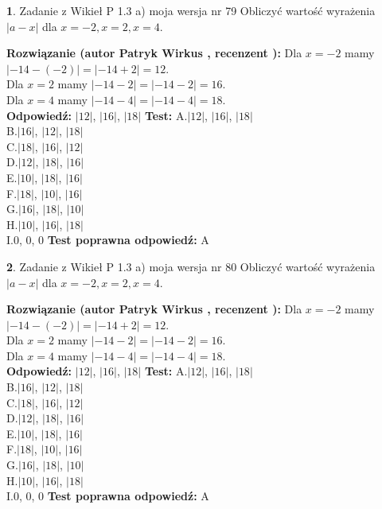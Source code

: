 \documentclass[12pt, a4paper]{article}
\theoremstyle{definition} %
\newtheorem{zad}{}
\newcommand{\zadStart}[1]{\begin{zad}#1\newline}
\newcommand{\zadStop}{\end{zad}}
\newcommand{\rozwStart}[2]{\noindent \textbf{Rozwiązanie (autor #1 , recenzent #2): }\newline}
\newcommand{\rozwStop}{\newline}
\newcommand{\odpStart}{\noindent \textbf{Odpowiedź:}\newline}
\newcommand{\odpStop}{\newline}
\newcommand{\testStart}{\noindent \textbf{Test:}\newline}
\newcommand{\testStop}{\newline}
\newcommand{\kluczStart}{\noindent \textbf{Test poprawna odpowiedź:}\newline}
\newcommand{\kluczStop}{\newline}
\begin{document}
\zadStart{Zadanie z Wikieł P 1.3 a) moja wersja nr 79}
Obliczyć wartość wyrażenia $|a - x|$ dla $x=-2,x=2,x=4$.
\zadStop
\rozwStart{Patryk Wirkus}{}
Dla $x = -2$ mamy $|-14 - (-2)| = |-14 + 2| = 12$.\\
Dla $x = 2$ mamy $|-14 - 2| = |-14 - 2| = 16$.\\
Dla $x = 4$ mamy $|-14 - 4| = |-14 - 4| = 18$.\\
\rozwStop
\odpStart
$|12|$, $|16|$, $|18|$
\odpStop
\testStart
A.$|12|$, $|16|$, $|18|$\\
B.$|16|$, $|12|$, $|18|$\\
C.$|18|$, $|16|$, $|12|$\\
D.$|12|$, $|18|$, $|16|$\\
E.$|10|$, $|18|$, $|16|$\\
F.$|18|$, $|10|$, $|16|$\\
G.$|16|$, $|18|$, $|10|$\\
H.$|10|$, $|16|$, $|18|$\\
I.$0$, $0$, $0$
\testStop
\kluczStart
A
\kluczStop



\zadStart{Zadanie z Wikieł P 1.3 a) moja wersja nr 80}
Obliczyć wartość wyrażenia $|a - x|$ dla $x=-2,x=2,x=4$.
\zadStop
\rozwStart{Patryk Wirkus}{}
Dla $x = -2$ mamy $|-14 - (-2)| = |-14 + 2| = 12$.\\
Dla $x = 2$ mamy $|-14 - 2| = |-14 - 2| = 16$.\\
Dla $x = 4$ mamy $|-14 - 4| = |-14 - 4| = 18$.\\
\rozwStop
\odpStart
$|12|$, $|16|$, $|18|$
\odpStop
\testStart
A.$|12|$, $|16|$, $|18|$\\
B.$|16|$, $|12|$, $|18|$\\
C.$|18|$, $|16|$, $|12|$\\
D.$|12|$, $|18|$, $|16|$\\
E.$|10|$, $|18|$, $|16|$\\
F.$|18|$, $|10|$, $|16|$\\
G.$|16|$, $|18|$, $|10|$\\
H.$|10|$, $|16|$, $|18|$\\
I.$0$, $0$, $0$
\testStop
\kluczStart
A
\kluczStop
\end{document}
